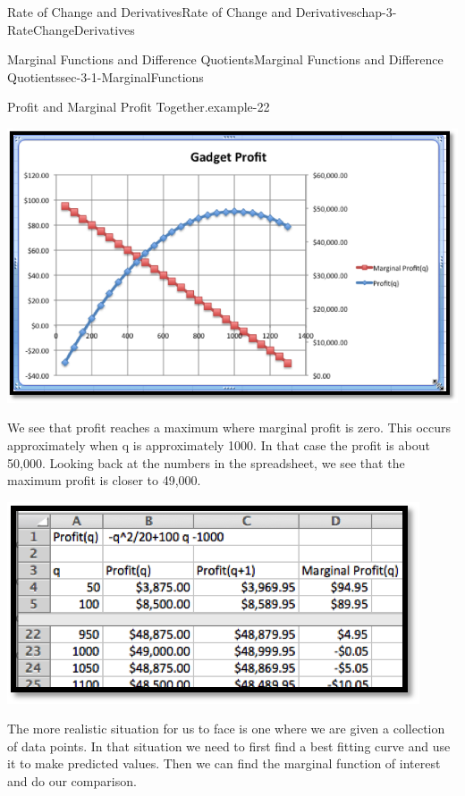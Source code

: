 \documentclass[oneside,10pt,]{book}
\numberwithin{equation}{section}
\begin{document}
\begin{chapterptx}{Rate of Change and Derivatives}{}{Rate of Change and Derivatives}{}{}{chap-3-RateChangeDerivatives}
\begin{sectionptx}{Marginal Functions and Difference Quotients}{}{Marginal Functions and Difference Quotients}{}{}{sec-3-1-MarginalFunctions}
\begin{example}{Profit and Marginal Profit Together.}{example-22}
\begin{sidebyside}{1}{0.15}{0.15}{0}
\begin{sbspanel}{0.7}
\includegraphics[width=1\linewidth]{images/sec3-1-5.png}
\end{sbspanel}%
\end{sidebyside}%
\par
\hypertarget{p-921}{}%
We see that profit reaches a maximum where marginal profit is zero.  This occurs approximately when q is approximately 1000.  In that case the profit is about \textdollar{}50,000.  Looking back at the numbers in the spreadsheet, we see that the maximum profit is closer to \textdollar{}49,000.%
\begin{sidebyside}{1}{0.25}{0.25}{0}%
\begin{sbspanel}{0.5}%
\includegraphics[width=1\linewidth]{images/sec3-1-6.png}
\end{sbspanel}%
\end{sidebyside}%
\end{example}
\hypertarget{p-922}{}%
The more realistic situation for us to face is one where we are given a collection of data points.  In that situation we need to first find a best fitting curve and use it to make predicted values.  Then we can find the marginal function of interest and do our comparison.%

\end{sectionptx}
\end{chapterptx}
\end{document}
